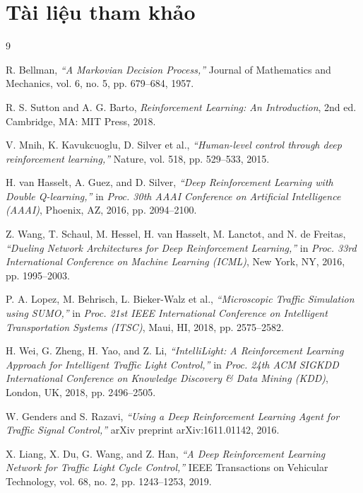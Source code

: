 \newpage
\section*{Tài liệu tham khảo}

\begin{thebibliography}{9}

R. Bellman,
\textit{``A Markovian Decision Process,''}
Journal of Mathematics and Mechanics, vol. 6, no. 5, pp. 679--684, 1957.

R. S. Sutton and A. G. Barto,
\textit{Reinforcement Learning: An Introduction}, 2nd ed.
Cambridge, MA: MIT Press, 2018.

V. Mnih, K. Kavukcuoglu, D. Silver et al.,
\textit{``Human-level control through deep reinforcement learning,''}
Nature, vol. 518, pp. 529--533, 2015.

H. van Hasselt, A. Guez, and D. Silver,
\textit{``Deep Reinforcement Learning with Double Q-learning,''}
in \textit{Proc. 30th AAAI Conference on Artificial Intelligence (AAAI)},
Phoenix, AZ, 2016, pp. 2094--2100.

Z. Wang, T. Schaul, M. Hessel, H. van Hasselt, M. Lanctot, and N. de Freitas,
\textit{``Dueling Network Architectures for Deep Reinforcement Learning,''}
in \textit{Proc. 33rd International Conference on Machine Learning (ICML)},
New York, NY, 2016, pp. 1995--2003.

P. A. Lopez, M. Behrisch, L. Bieker-Walz et al.,
\textit{``Microscopic Traffic Simulation using SUMO,''}
in \textit{Proc. 21st IEEE International Conference on Intelligent Transportation Systems (ITSC)},
Maui, HI, 2018, pp. 2575--2582.

H. Wei, G. Zheng, H. Yao, and Z. Li,
\textit{``IntelliLight: A Reinforcement Learning Approach for Intelligent Traffic Light Control,''}
in \textit{Proc. 24th ACM SIGKDD International Conference on Knowledge Discovery \& Data Mining (KDD)},
London, UK, 2018, pp. 2496--2505.

W. Genders and S. Razavi,
\textit{``Using a Deep Reinforcement Learning Agent for Traffic Signal Control,''}
arXiv preprint arXiv:1611.01142, 2016.

X. Liang, X. Du, G. Wang, and Z. Han,
\textit{``A Deep Reinforcement Learning Network for Traffic Light Cycle Control,''}
IEEE Transactions on Vehicular Technology, vol. 68, no. 2, pp. 1243--1253, 2019.

\end{thebibliography}
